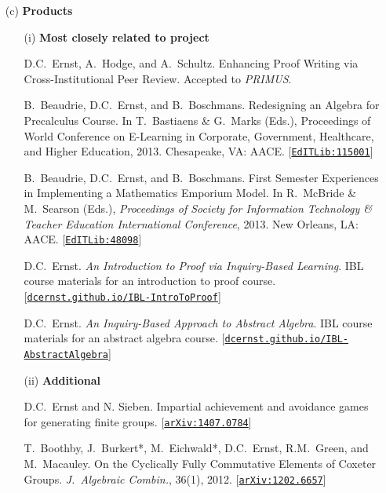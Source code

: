 \documentclass[11pt]{article}
\begin{document}
\begin{enumerate}[leftmargin=*]
\item[(c)] \textbf{Products}

\begin{enumerate}[leftmargin=\parindent]
\item[(i)] \textbf{Most closely related to project}

D.C.~Ernst, A.~Hodge, and A.~Schultz.  Enhancing Proof Writing via Cross-Institutional Peer Review. Accepted to \emph{PRIMUS}.

\vspace{.25em}

B.~Beaudrie, D.C.~Ernst, and B.~Boschmans. Redesigning an Algebra for Precalculus Course. In T.~Bastiaens \& G.~Marks (Eds.), Proceedings of World Conference on E-Learning in Corporate, Government, Healthcare, and Higher Education, 2013. Chesapeake, VA: AACE. [\href{http://www.editlib.org/p/115001/}{\texttt{EdITLib:115001}}]

\vspace{.25em}

B.~Beaudrie, D.C.~Ernst, and B.~Boschmans. First Semester Experiences in Implementing a Mathematics Emporium Model. In R.~McBride \& M.~Searson (Eds.), \emph{Proceedings of Society for Information Technology \& Teacher Education International Conference}, 2013.  New Orleans, LA: AACE.  [\href{http://www.editlib.org/p/48098}{\texttt{EdITLib:48098}}]

\vspace{.25em}

D.C.~Ernst. \emph{An Introduction to Proof via Inquiry-Based Learning}.  IBL course materials for an introduction to proof course. [\href{http://dcernst.github.io/IBL-IntroToProof}{\texttt{dcernst.github.io/IBL-IntroToProof}}]

\vspace{.25em}

D.C.~Ernst. \emph{An Inquiry-Based Approach to Abstract Algebra}.  IBL course materials for an abstract algebra course. [\href{http://dcernst.github.io/IBL-AbstractAlgebra}{\texttt{dcernst.github.io/IBL-AbstractAlgebra}}]
 
\item[(ii)] \textbf{Additional}

D.C.~Ernst and N. Sieben. Impartial achievement and avoidance games for generating finite groups. [\href{http://arxiv.org/abs/1407.0784}{\texttt{arXiv:1407.0784}}]

\vspace{.25em}

T.~Boothby, J.~Burkert*, M.~Eichwald*, D.C.~Ernst, R.M.~Green, and M.~Macauley. On the Cyclically Fully Commutative Elements of Coxeter Groups.  \emph{J.~Algebraic Combin.}, 36(1), 2012.  [\href{http://arxiv.org/abs/1202.6657}{\texttt{arXiv:1202.6657}}]


\end{enumerate}
\end{enumerate}
\end{document}
